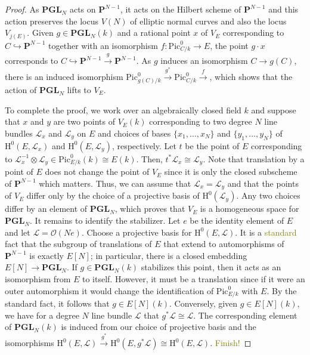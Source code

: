 \documentclass[10pt,letterpaper,twoside]{article}
\newcommand{\BA}[1]{\textcolor{olive}{#1}}
\newcommand{\Lscr}{\mathcal{L}}
\newcommand{\Oscr}{\mathcal{O}}
\renewcommand{\H}{\mathrm{H}}
\renewcommand{\1}{\mathbf{1}}
\newcommand{\bP}{\mathbf{P}}
\newcommand{\PGL}{\mathbf{PGL}}
\newcommand{\Pic}{\mathrm{Pic}}
\newcommand{\iso}{\cong}
\theoremstyle{plain}
\theoremstyle{plain}
\theoremstyle{definition}
\theoremstyle{named}
\theoremstyle{definition}
\begin{document}
	\begin{proof}
		As $\PGL_N$ acts on $\bP^{N-1}$, it acts on the Hilbert scheme of $\bP^{N-1}$ and this action
		preserves the locus $V(N)$ of elliptic normal curves and also the locus $V_{j(E)}$.
		Given $g\in\PGL_N(k)$ and a rational point $x$ of $V_E$ corresponding to $C\hookrightarrow\bP^{N-1}$
		together with an isomorphism $f\colon\Pic^0_{C/k}\rightarrow E$, the point $g\cdot x$
		corresponds to $C\hookrightarrow\bP^{N-1}\xrightarrow{g}\bP^{N-1}$. As $g$ induces an isomorphism
		$C\rightarrow g(C)$, there is an induced isomorphism
		$\Pic^0_{g(C)/k}\xrightarrow{g^*}\Pic^0_{C/k}\xrightarrow{f}$, which shows that the action of
		$\PGL_N$ lifts to $V_E$.
		
		To complete the proof, we work over an algebraically closed field $k$ and suppose that $x$ and $y$
		are two points of $V_E(k)$ corresponding to two degree $N$ line bundles $\Lscr_x$ and
		$\Lscr_y$ on $E$ and choices of bases $\{x_1,\ldots,x_N\}$ and $\{y_1,\ldots,y_N\}$ of
		$\H^0(E,\Lscr_x)$ and $\H^0(E,\Lscr_y)$, respectively. Let $t$ be the point of $E$
		corresponding to $\Lscr_x^{-1}\otimes\Lscr_y\in\Pic^0_{E/k}(k)\iso E(k)$. Then,
		$t^*\Lscr_x\iso\Lscr_y$. Note that translation by a point of $E$ does not change the point of
		$V_E$ since it is only the closed subscheme of $\bP^{N-1}$ which matters. Thus, we can assume
		that $\Lscr_x=\Lscr_y$ and that the points of $V_E$ differ only by the choice of a projective basis of
		$\H^0(\Lscr_y)$. Any two choices differ by an element of $\PGL_N$, which proves that $V_E$ is a
		homogeneous space for $\PGL_N$. It remains to identify the stabilizer. Let $e$ be the identity
		element of $E$ and let $\Lscr=\Oscr(Ne)$. Choose a projective basis for $\H^0(E,\Lscr)$. It is a \BA{standard}
		fact that the subgroup of translations of $E$ that extend to automorphisms of $\bP^{N-1}$ is
		exactly $E[N]$; in particular, there is a closed embedding $E[N]\rightarrow\PGL_N$. If
		$g\in\PGL_N(k)$ stabilizes this point, then it acts as an isomorphism from $E$ to itself.
		However, it must be a translation since if it were an outer automorphism it would change the
		identification of $\Pic^0_{E/k}$ with $E$. By the standard fact, it follows that $g\in E[N](k)$.
		Conversely, given $g\in E[N](k)$, we have for a degree $N$ line bundle $\Lscr$ that
		$g^*\Lscr\iso\Lscr$. The corresponding element of $\PGL_N(k)$ is induced from our choice of
		projective basis and the isomorphisms
		$\H^0(E,\Lscr)\xrightarrow{g^*}\H^0(E,g^*\Lscr)\iso\H^0(E,\Lscr)$. \BA{Finish!}
	\end{proof}
	
\end{document}
